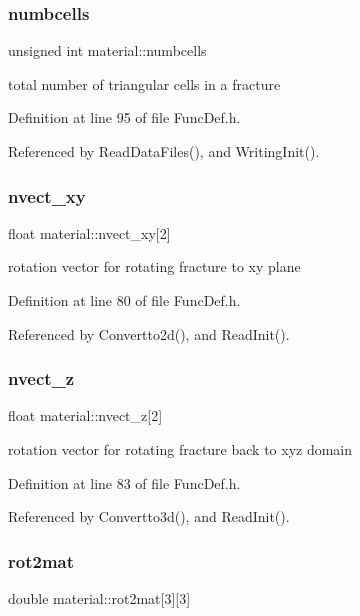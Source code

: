 \subsubsection{\texorpdfstring{numbcells}{numbcells}}
{\footnotesize\ttfamily unsigned int material\+::numbcells}

total number of triangular cells in a fracture 

Definition at line 95 of file Func\+Def.\+h.



Referenced by Read\+Data\+Files(), and Writing\+Init().

\mbox{\label{structmaterial_a64fad3469b934d7e29be84f2d9b7d7a3}} 
\subsubsection{\texorpdfstring{nvect\_xy}{nvect\_xy}}
{\footnotesize\ttfamily float material\+::nvect\+\_\+xy\mbox{[}2\mbox{]}}

rotation vector for rotating fracture to xy plane 

Definition at line 80 of file Func\+Def.\+h.



Referenced by Convertto2d(), and Read\+Init().

\mbox{\label{structmaterial_aa0a097a3f8fe23d9b3bd41d80cbfacfd}} 
\subsubsection{\texorpdfstring{nvect\_z}{nvect\_z}}
{\footnotesize\ttfamily float material\+::nvect\+\_\+z\mbox{[}2\mbox{]}}

rotation vector for rotating fracture back to xyz domain 

Definition at line 83 of file Func\+Def.\+h.



Referenced by Convertto3d(), and Read\+Init().

\mbox{\label{structmaterial_a572b56f5488c560ee0fe118592b660a7}} 
\subsubsection{\texorpdfstring{rot2mat}{rot2mat}}
{\footnotesize\ttfamily double material\+::rot2mat\mbox{[}3\mbox{]}\mbox{[}3\mbox{]}}

